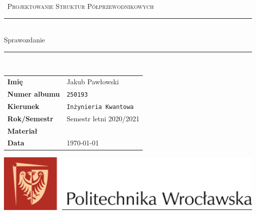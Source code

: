 \documentclass[12pt,openany,a4paper]{book}
\begin{document}
	

	
	\begin{titlepage}
		\clearpage\thispagestyle{empty}
		\centering
		\vspace{1cm}
		
		{\
			\textsc{Projektowanie Struktur Półprzewodnikowych}
		}
		\vspace{2.5cm}
		
		\rule{\linewidth}{2mm} \\[0.8cm]
		{ \LARGE \sc Sprawozdanie}\\[0.55cm]
		\rule{\linewidth}{0.6mm} \\[3.4cm]
		
		\hspace{2cm}
		\begin{tabular}{l p{5cm}}
			\textbf{Imię} & Jakub Pawłowski \\[10pt]
			\textbf{Numer albumu} & \texttt{250193} \\[10pt]
			\textbf{Kierunek} & \texttt{Inżynieria Kwantowa} \\[10pt]
			\textbf{Rok/Semestr} & Semestr letni 2020/2021 \\[10pt]
			\textbf{Materiał} & \BPChem{AlGaAsSb} \\[10pt]
			\textbf{Data} & \today \\            
		\end{tabular}
		
		
		\vfill
		\centering \includegraphics[width = \linewidth]{Figures/pwr.png}
		\vspace{0.5cm}
		
		
		
		
		\pagebreak
		
	\end{titlepage}
	
	
\end{document}
